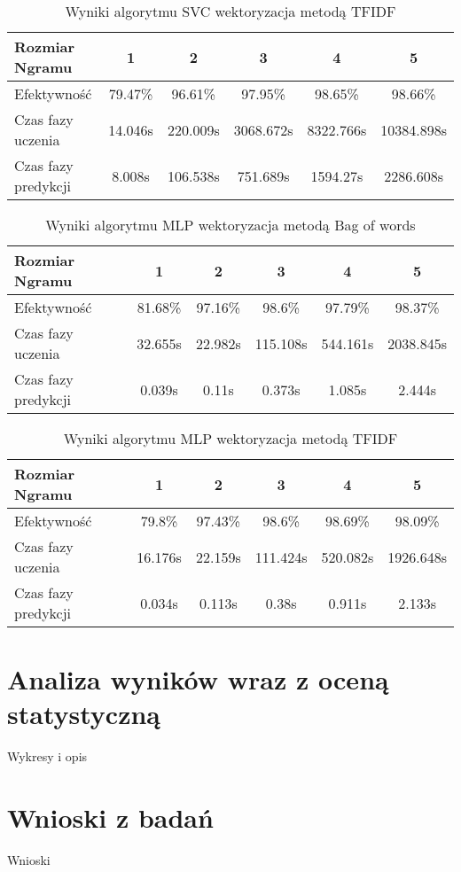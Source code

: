 \begin{table}[h!]
    \centering
    \caption{Wyniki algorytmu SVC wektoryzacja metodą TFIDF}
    \begin{tabular}{ | l | c | c | c | c | c |}
        \hline
        Rozmiar Ngramu & 1 & 2 & 3 & 4 & 5   \\ \hline
        Efektywność & 79.47\% & 96.61\% & 97.95\% & 98.65\% & 98.66\% \\ \hline
        Czas fazy uczenia & 14.046s & 220.009s & 3068.672s & 8322.766s & 10384.898s \\ \hline
        Czas fazy predykcji & 8.008s & 106.538s & 751.689s & 1594.27s & 2286.608s  \\ \hline
    \end{tabular}
\end{table}

\begin{table}[h!]
    \centering
    \caption{Wyniki algorytmu MLP wektoryzacja metodą Bag of words}
    \begin{tabular}{ | l | c | c | c | c | c |}
        \hline
        Rozmiar Ngramu & 1 & 2 & 3 & 4 & 5  \\ \hline
        Efektywność & 81.68\% & 97.16\% & 98.6\% & 97.79\% & 98.37\%   \\ \hline
        Czas fazy uczenia & 32.655s & 22.982s & 115.108s & 544.161s & 2038.845s  \\ \hline
        Czas fazy predykcji & 0.039s & 0.11s & 0.373s & 1.085s & 2.444s  \\ \hline
    \end{tabular}
\end{table}

\begin{table}[h!]
    \centering
    \caption{Wyniki algorytmu MLP wektoryzacja metodą TFIDF}
    \begin{tabular}{ | l | c | c | c | c | c |}
        \hline
        Rozmiar Ngramu & 1 & 2 & 3 & 4 & 5   \\ \hline
        Efektywność & 79.8\% & 97.43\% & 98.6\% & 98.69\% & 98.09\%   \\ \hline
        Czas fazy uczenia & 16.176s & 22.159s & 111.424s & 520.082s & 1926.648s  \\ \hline
        Czas fazy predykcji & 0.034s & 0.113s & 0.38s & 0.911s & 2.133s  \\ \hline
    \end{tabular}
\end{table}
\section{Analiza wyników wraz z oceną statystyczną}
Wykresy i opis
\section{Wnioski z badań}
Wnioski

